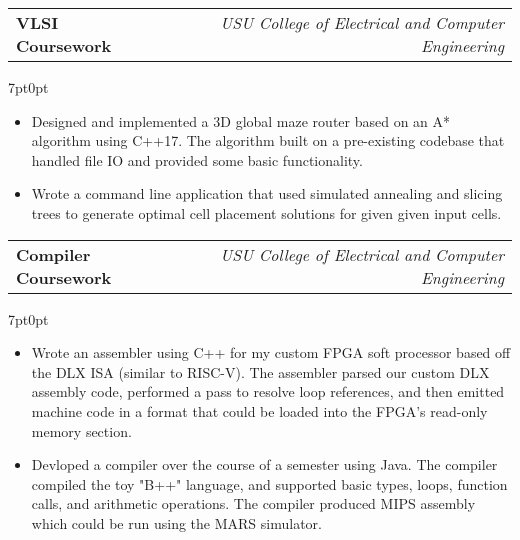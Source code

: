 \documentclass[letterpaper,12pt]{article}
\makeatletter
\newcommand{\simpleHeading}[2]{
    \vspace{-1pt}
    \begin{tabular*}{0.99\textwidth}[t]{l@{\extracolsep{\fill}}r}
        #1 & #2 \\
    \end{tabular*}
}
\newcommand{\simpleParagraph}[1]{
    \vspace{-1pt}
    \begin{adjustwidth}{7pt}{0pt}
        #1
    \end{adjustwidth}
}
\makeatother
\begin{document}
    \vspace{10pt}
    \simpleHeading{\textbf{VLSI Coursework}}{\textit{USU College of Electrical and Computer Engineering}}

    \simpleParagraph{
        \begin{itemize}
            \item Designed and implemented a 3D global maze router based on an A* algorithm using C++17. The algorithm
                built on a pre-existing codebase that handled file IO and provided some basic functionality.

            \item Wrote a command line application that used simulated annealing and slicing
                trees to generate optimal cell placement solutions for given given input cells.

        \end{itemize}
    }
    

    

    
    \vspace{10pt}
    \simpleHeading{\textbf{Compiler Coursework}}{\textit{USU College of Electrical and Computer Engineering}}

    \simpleParagraph{
        \begin{itemize}
            \item Wrote an assembler using C++ for my custom FPGA soft processor based off the DLX ISA (similar
                to RISC-V). The assembler parsed our custom DLX assembly code, performed a pass to resolve
                loop references, and then emitted machine code in a format that could be loaded into the FPGA's 
                read-only memory section.

            \item Devloped a compiler over the course of a semester using Java.
                The compiler compiled the toy "B++" language, and supported basic types, loops, function calls,
                and arithmetic operations. The compiler produced MIPS assembly which could be run using the 
                MARS simulator.

        \end{itemize}
    }
    
\end{document}
